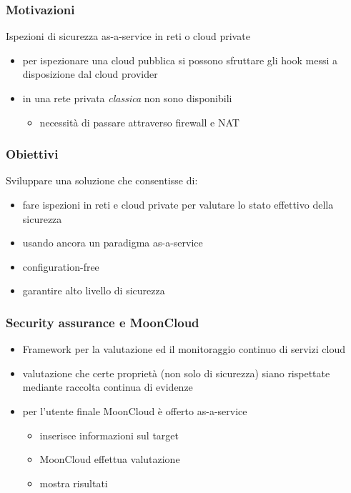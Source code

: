 \begin{frame}
	\frametitle{Motivazioni}
		
	\alert{Ispezioni di sicurezza as-a-service} in \alert{reti} o \alert{cloud private}
		
	\begin{itemize}
		\item per ispezionare una cloud pubblica si possono sfruttare
		      gli \alert{hook} messi a disposizione dal cloud provider
		\item in una rete privata \textit{classica} non sono disponibili
		      		      
		      \begin{itemize}
		      	\item necessità di passare attraverso \alert{firewall} e \alert{NAT}
		      \end{itemize}
	\end{itemize}
		
\end{frame}

\begin{frame}
	\frametitle{Obiettivi}
	Sviluppare una soluzione che consentisse di:
	\begin{itemize}
		\item fare \alert{ispezioni} in reti e cloud private per
		      valutare lo \alert{stato effettivo} della sicurezza
		\item usando ancora un paradigma \alert{as-a-service}
		\item \alert{configuration-free}
		\item garantire alto livello di sicurezza
	\end{itemize}
\end{frame}

\begin{frame}
	\frametitle{Security assurance e MoonCloud}
	\begin{itemize}
		\item Framework per la \alert{valutazione}
		      ed il \alert{monitoraggio continuo} di servizi
		      cloud
		\item valutazione che certe proprietà (non solo di sicurezza)
		      siano rispettate
		      mediante \alert{raccolta continua di evidenze}
		\item per l'utente finale MoonCloud è offerto \alert{as-a-service}
		      \begin{itemize}
		      	\item inserisce informazioni sul target
		      	\item MoonCloud effettua valutazione
		      	\item mostra risultati
		      \end{itemize}
	\end{itemize}
\end{frame}

